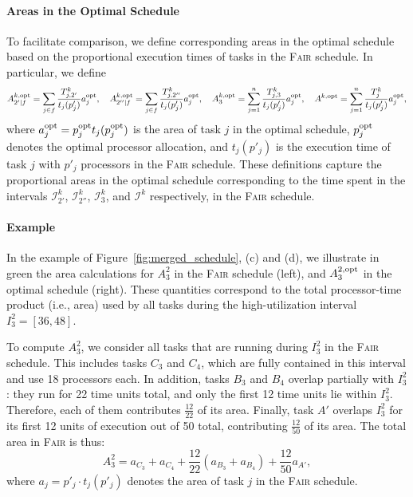 \documentclass{article}
\newcommand\fair{\textsc{Fair}\xspace}
\newcommand\opt{\textnormal{opt}\xspace}
\begin{document}
\paragraph{Areas in the Optimal Schedule}
To facilitate comparison, we define corresponding areas in the optimal schedule based on the proportional execution times of tasks in the \textsc{Fair} schedule. In particular, we define
\[
A^{k,\opt}_{2'|f} = \sum_{j \in f} \frac{T_{j,2'}^{k}}{t_j(p'_j)} a_j^{\opt},\quad
A^{k,\opt}_{2''|f} = \sum_{j \in f} \frac{T_{j,2''}^{k}}{t_j(p'_j)} a_j^{\opt},\quad
A^{k,\opt}_{3} = \sum_{j=1}^{n} \frac{T_{j,3}^{k}}{t_j(p'_j)} a_j^{\opt},\quad 
A^{k,\opt} = \sum_{j=1}^{n} \frac{T_{j}^{k}}{t_j(p'_j)} a_j^{\opt},
\]
where \(a_j^{\opt} = p_j^{\opt} t_j(p_j^{\opt})\) is the area of task \(j\) in the optimal schedule, \(p_j^{\opt}\) denotes the optimal processor allocation, and \(t_j(p'_j)\) is the execution time of task \(j\) with \(p'_j\) processors in the \textsc{Fair} schedule. These definitions capture the proportional areas in the optimal schedule corresponding to the time spent in the intervals \(\mathcal{I}_{2'}^{k}\), \(\mathcal{I}_{2''}^{k}\), \(\mathcal{I}_{3}^{k}\), and \(\mathcal{I}^{k}\) respectively, in the \fair schedule.



\paragraph{Example}

In the example of Figure~\ref{fig:merged_schedule}, (c) and (d), we illustrate in green the area calculations for $A_3^2$ in the \textsc{Fair} schedule (left), and $A_3^{2,\opt}$ in the optimal schedule (right). These quantities correspond to the total processor-time product (i.e., area) used by all tasks during the high-utilization interval $I_3^2 = [36,48]$.

To compute $A_3^2$, we consider all tasks that are running during $I_3^2$ in the \textsc{Fair} schedule. This includes tasks $C_3$ and $C_4$, which are fully contained in this interval and use 18 processors each. In addition, tasks $B_3$ and $B_4$ overlap partially with $I_3^2$: they run for 22 time units total, and only the first 12 time units lie within $I_3^2$. Therefore, each of them contributes $\frac{12}{22}$ of its area. Finally, task $A'$ overlaps $I_3^2$ for its first 12 units of execution out of 50 total, contributing $\frac{12}{50}$ of its area. The total area in \textsc{Fair} is thus:
\[
A_3^2 = a_{C_3} + a_{C_4} + \frac{12}{22}(a_{B_3} + a_{B_4}) + \frac{12}{50} a_{A'},
\]
where $a_j = p'_j \cdot t_j(p'_j)$ denotes the area of task $j$ in the \textsc{Fair} schedule.
\end{document}

